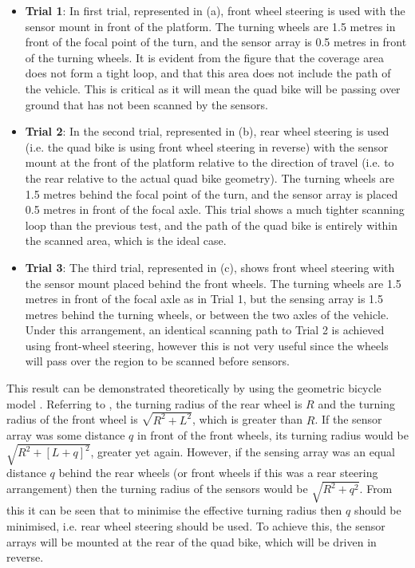 \documentclass[main.tex]{subfiles}
\begin{document}
\begin{itemize}
\item \textbf{Trial 1}: In first trial, represented in  (a), front wheel steering is used with the sensor mount in front of the platform. The turning wheels are 1.5 metres in front of the focal point of the turn, and the sensor array is 0.5 metres in front of the turning wheels. It is evident from the figure that the coverage area does not form a tight loop, and that this area does not include the path of the vehicle. This is critical as it will mean the quad bike will be passing over ground that has not been scanned by the sensors.
\item \textbf{Trial 2}: In the second trial, represented in (b), rear wheel steering is used (i.e. the quad bike is using front wheel steering in reverse) with the sensor mount at the front of the platform relative to the direction of travel (i.e. to the rear relative to the actual quad bike geometry). The turning wheels are 1.5 metres behind the focal point of the turn, and the sensor array is placed 0.5 metres in front of the focal axle. This trial shows a much tighter scanning loop than the previous test, and the path of the quad bike is entirely within the scanned area, which is the ideal case.
\item \textbf{Trial 3}: The third trial, represented in  (c), shows front wheel steering with the sensor mount placed behind the front wheels. The turning wheels are 1.5 metres in front of the focal axle as in Trial 1, but the sensing array is 1.5 metres behind the turning wheels, or between the two axles of the vehicle. Under this arrangement, an identical scanning path to Trial 2 is achieved using front-wheel steering, however this is not very useful since the wheels will pass over the region to be scanned before sensors.
\end{itemize}

This result can be demonstrated theoretically by using the geometric bicycle model \parencite{snider2009}. Referring to , the turning radius of the rear wheel is $R$ and the turning radius of the front wheel is $\sqrt{R^2 + L^2}$, which is greater than $R$. If the sensor array was some distance $q$ in front of the front wheels, its turning radius would be $\sqrt{R^2 + [L+q]^2}$, greater yet again. However, if the sensing array was an equal distance $q$ behind the rear wheels (or front wheels if this was a rear steering arrangement) then the turning radius of the sensors would be $\sqrt{R^2 + q^2}$. From this it can be seen that to minimise the effective turning radius then $q$ should be minimised, i.e. rear wheel steering should be used. To achieve this, the sensor arrays will be mounted at the rear of the quad bike, which will be driven in reverse. 
%
\end{document}
